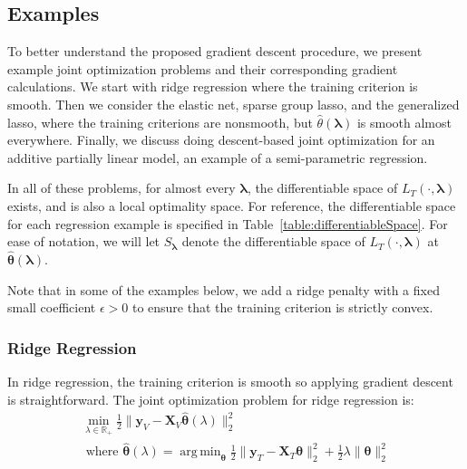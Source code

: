 \documentclass[10pt,letterpaper]{article}
\DeclareMathOperator*{\argmin}{arg\,min}
\begin{document}
\subsection{Examples}

To better understand the proposed gradient descent procedure, we present example joint optimization problems and their corresponding gradient calculations. We start with ridge regression where the training criterion is smooth. Then we consider the elastic net, sparse group lasso, and the generalized lasso, where the training criterions are nonsmooth, but $\hat{\theta}(\boldsymbol\lambda)$ is smooth almost everywhere. Finally, we discuss doing descent-based joint optimization for an additive partially linear model, an example of a semi-parametric regression.

In all of these problems, for almost every $\boldsymbol{\lambda}$, the differentiable space of $L_T(\cdot, \boldsymbol{\lambda})$ exists, and is also a local optimality space. For reference, the differentiable space for each regression example is specified in Table~\ref{table:differentiableSpace}. For ease of notation, we will let $S_{\boldsymbol{\lambda}}$ denote the differentiable space of $L_T(\cdot, \boldsymbol{\lambda})$ at $\hat{\boldsymbol{\theta}}(\boldsymbol{\lambda})$.

Note that in some of the examples below, we add a ridge penalty with a fixed small coefficient $\epsilon > 0$ to ensure that the training criterion is strictly convex.

\subsubsection{Ridge Regression}

In ridge regression, the training criterion is smooth so applying gradient descent is straightforward. The joint optimization problem for ridge regression is:
\begin{equation}
\begin{array}{c}
\min_{\lambda\in \mathbb{R}_{+}} \frac{1}{2} \| \boldsymbol{y}_V - \boldsymbol{X}_V \hat{\boldsymbol{\theta}} (\lambda) \|_2 ^2 \\
\text{  where  } \hat{\boldsymbol{\theta}} (\lambda) = \argmin_{\boldsymbol{\theta}} \frac{1}{2} \| \boldsymbol{y}_T - \boldsymbol{X}_T \boldsymbol{\theta} \|_2 ^2 + \frac{1}{2} \lambda \| \boldsymbol{\theta} \|_2^2
\end{array}
\end{equation}
\end{document}

